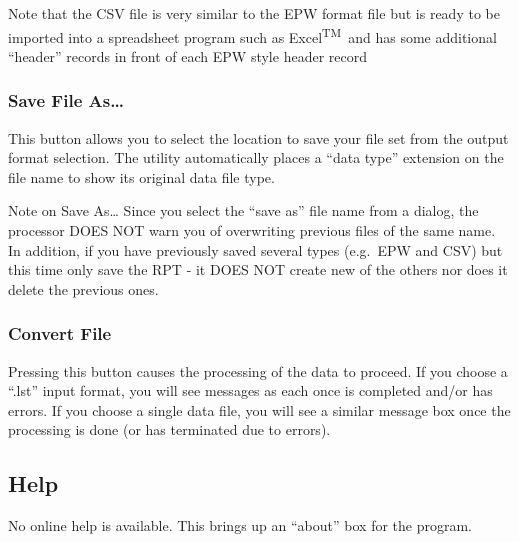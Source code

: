 Note that the CSV file is very similar to the EPW format file but is ready to be imported into a spreadsheet program such as Excel\textsuperscript{TM}\ and has some additional ``header'' records in front of each EPW style header record

\subsubsection{Save File As\ldots{}}\label{save-file-as}

This button allows you to select the location to save your file set from the output format selection. The utility automatically places a ``data type'' extension on the file name to show its original data file type.

Note on Save As\ldots{} Since you select the ``save as'' file name from a dialog, the processor DOES NOT warn you of overwriting previous files of the same name. In addition, if you have previously saved several types (e.g.~EPW and CSV) but this time only save the RPT - it DOES NOT create new of the others nor does it delete the previous ones.

\subsubsection{Convert File}\label{convert-file}

Pressing this button causes the processing of the data to proceed. If you choose a ``.lst'' input format, you will see messages as each once is completed and/or has errors. If you choose a single data file, you will see a similar message box once the processing is done (or has terminated due to errors).

\subsection{Help}\label{help}

No online help is available. This brings up an ``about'' box for the program.
